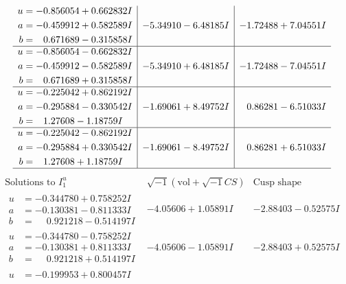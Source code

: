 \documentclass[1p]{elsarticle_modified}
\theoremstyle{definition}
\newcommand{\I}{\sqrt{-1}}
\begin{document}
$$\begin{array}{c|c|c}
\begin{aligned}
u &= -0.856054 + 0.662832 I \\
a &= -0.459912 + 0.582589 I \\
b &= \phantom{-}0.671689 - 0.315858 I\end{aligned}
 & -5.34910 - 6.48185 I & -1.72488 + 7.04551 I \\ \hline\begin{aligned}
u &= -0.856054 - 0.662832 I \\
a &= -0.459912 - 0.582589 I \\
b &= \phantom{-}0.671689 + 0.315858 I\end{aligned}
 & -5.34910 + 6.48185 I & -1.72488 - 7.04551 I \\ \hline\begin{aligned}
u &= -0.225042 + 0.862192 I \\
a &= -0.295884 - 0.330542 I \\
b &= \phantom{-}1.27608 - 1.18759 I\end{aligned}
 & -1.69061 + 8.49752 I & \phantom{-}0.86281 - 6.51033 I \\ \hline\begin{aligned}
u &= -0.225042 - 0.862192 I \\
a &= -0.295884 + 0.330542 I \\
b &= \phantom{-}1.27608 + 1.18759 I\end{aligned}
 & -1.69061 - 8.49752 I & \phantom{-}0.86281 + 6.51033 I\\
 \hline 
 \end{array}$$\newpage$$\begin{array}{c|c|c}  
\text{Solutions to }I^u_{1}& \I (\text{vol} + \sqrt{-1}CS) & \text{Cusp shape}\\
 \hline 
\begin{aligned}
u &= -0.344780 + 0.758252 I \\
a &= -0.130381 - 0.811333 I \\
b &= \phantom{-}0.921218 - 0.514197 I\end{aligned}
 & -4.05606 + 1.05891 I & -2.88403 - 0.52575 I \\ \hline\begin{aligned}
u &= -0.344780 - 0.758252 I \\
a &= -0.130381 + 0.811333 I \\
b &= \phantom{-}0.921218 + 0.514197 I\end{aligned}
 & -4.05606 - 1.05891 I & -2.88403 + 0.52575 I \\ \hline\begin{aligned}
u &= -0.199953 + 0.800457 I \\

\end{aligned}
\end{array}$$
\end{document}
